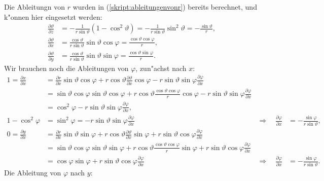 Die Ableitungn von $r$ wurden in (\ref{skript:ableitungenvonr}) bereits berechnet,
und k"onnen hier eingesetzt werden:
\begin{equation}
\begin{aligned}
\frac{\partial\vartheta}{\partial z}
&=
-\frac{1}{r\sin\vartheta}(1-\cos^2\vartheta)
=
-\frac{1}{r\sin\vartheta}\sin^2\vartheta
=
-\frac{\sin\vartheta}{r},
\\
\frac{\partial \vartheta}{\partial x}
&=
\frac{\cos\vartheta}{r\sin\vartheta}\sin\vartheta\cos\varphi
=
\frac{\cos\vartheta\cos\varphi}{r},
\\
\frac{\partial \vartheta}{\partial y}
&=
\frac{\cos\vartheta}{r\sin\vartheta}\sin\vartheta\sin\varphi
=
\frac{\cos\vartheta\sin\varphi}{r}.
\end{aligned}
\label{skript:ableitungenvonvartheta}
\end{equation}
Wir brauchen noch die Ableitungen von $\varphi$, zun"achst nach $x$:
\begin{align*}
1=
\frac{\partial x}{\partial x}
&=
\frac{\partial r}{\partial x}\sin\vartheta\cos\varphi
+
r\cos\vartheta \frac{\partial\vartheta}{\partial x}\cos\varphi
-
r\sin\vartheta\sin\varphi\frac{\partial\varphi}{\partial x}
\\
&=
\sin\vartheta \cos\varphi
\sin\vartheta\cos\varphi
+
r\cos\vartheta
\frac{\cos\vartheta \cos\varphi}{r}
\cos\varphi
-
r\sin\vartheta\sin\varphi
\frac{\partial\varphi}{\partial x}
\\
&=\cos^2\varphi-r\sin\vartheta\sin\varphi\frac{\partial\varphi}{\partial x},
\\
1-\cos^2\varphi
&=
\sin^2\varphi=
-r\sin\vartheta\sin\varphi\frac{\partial\varphi}{\partial x}
&\Rightarrow\quad
\frac{\partial\varphi}{\partial x}
&=-\frac{\sin\varphi}{r\sin\vartheta},
\\
0=
\frac{\partial y}{\partial x}
&=
\frac{\partial r}{\partial x} \sin\vartheta\sin\varphi
+
r\cos\vartheta \frac{\partial\vartheta}{\partial x}\sin\varphi
+
r\sin\vartheta\cos\varphi\frac{\partial\varphi}{\partial x}
\\
&=
\sin\vartheta\cos\varphi
\sin\vartheta\sin\varphi
+
r\cos\vartheta
\frac{\cos\vartheta\cos\varphi}{r}
\sin\varphi
+
r\sin\vartheta\cos\varphi\frac{\partial\varphi}{\partial x}
\\
&=
\cos\varphi\sin\varphi
+
r\sin\vartheta\cos\varphi
\frac{\partial\varphi}{\partial x}
&\Rightarrow\quad
\frac{\partial\varphi}{\partial x}
&=
-\frac{\sin\varphi}{r\sin\vartheta}.
\end{align*}
Die Ableitung von $\varphi$ nach $y$:
